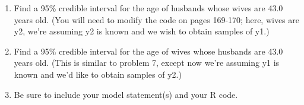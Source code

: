 \documentclass[12pt]{article}
\begin{document}
\begin{enumerate}
\item Find a 95\% credible interval for the age of husbands whose wives are
43.0 years old. (You will need to modify the code on pages 169-170; here,
wives are y2, we're assuming y2 is known and we wish to obtain samples
of y1.)

\item Find a 95\% credible interval for the age of wives whose husbands are
43.0 years old. (This is similar to problem 7, except now we're assuming y1 is known
and we'd like to obtain samples of y2.)

\item Be sure to include your model statement(s) and your R code.

\end{enumerate}
\end{document}
